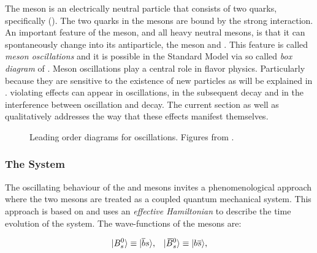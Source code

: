 The \Bs meson is an electrically neutral particle that consists of two quarks, specifically (\bquarkbar\squark).
The two quarks in the mesons are bound by the strong interaction. An important feature of
the \Bs meson, and all heavy neutral mesons, is that it can spontaneously change into its antiparticle,
the \Bsb meson and \viceversa. This feature is called {\it meson oscillations} and it is possible
in the Standard Model via so called {\it box diagram} of .
Meson oscillations play a central role in flavor physics. Particularly because they are sensitive to the
existence of new particles as will be explained in . \CP violating effects can
appear in \BBbarSyst oscillations, in the subsequent decay and in the interference between oscillation
and decay. The current section as well as  qualitatively addresses the way that
these effects manifest themselves.

\begin{figure}[!h]
  \centering
  \begin{subfigure}{0.5\textwidth}
    \centering
    \raggedright
    \scalebox{0.9}{\sffamily }
    \caption{}
    \label{bs_box_1}
  \end{subfigure}%
  \hfill%
  \begin{subfigure}{0.5\textwidth}
    \centering
    \raggedleft
    \scalebox{0.9}{\sffamily }
    \caption{}
    \label{bs_box_2}
  \end{subfigure}
  \caption{Leading order diagrams for \BBbarSyst oscillations. Figures from \cite{jeroenThesis}.}
  \label{bs_box}
\end{figure}

\subsubsection{The \BBbarSyst System}
\label{the_bbar_system}

The oscillating behaviour of the \Bs and \Bsb mesons invites a phenomenological approach
where the two mesons are treated as a coupled quantum mechanical system. This approach
is based on \cite{Weisskopf:1930au,Weisskopf:1930ps} and uses an {\it effective Hamiltonian}
\cite{eff-hamiltonian-bs-syst,DeBruyn-thesis} to describe the time evolution of the system.
The wave-functions of the mesons are:

\begin{equation}
  \centering
  \ket{\Bs}  \equiv  \ket{\bquarkbar\squark}, \;\;\; \ket{\Bsb} \equiv  \ket{\bquark\squarkbar},
  \label{bs_wavefunctions}
\end{equation}

